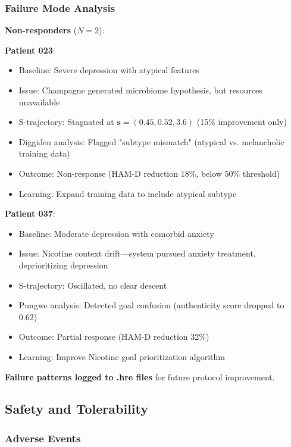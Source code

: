 \subsubsection{Failure Mode Analysis}

\textbf{Non-responders} ($N=2$):

\textbf{Patient 023}:
\begin{itemize}
\item Baseline: Severe depression with atypical features
\item Issue: Champagne generated microbiome hypothesis, but resources unavailable
\item S-trajectory: Stagnated at $\mathbf{s} = (0.45, 0.52, 3.6)$ (15\% improvement only)
\item Diggiden analysis: Flagged "subtype mismatch" (atypical vs. melancholic training data)
\item Outcome: Non-response (HAM-D reduction 18\%, below 50\% threshold)
\item Learning: Expand training data to include atypical subtype
\end{itemize}

\textbf{Patient 037}:
\begin{itemize}
\item Baseline: Moderate depression with comorbid anxiety
\item Issue: Nicotine context drift—system pursued anxiety treatment, deprioritizing depression
\item S-trajectory: Oscillated, no clear descent
\item Pungwe analysis: Detected goal confusion (authenticity score dropped to 0.62)
\item Outcome: Partial response (HAM-D reduction 32\%)
\item Learning: Improve Nicotine goal prioritization algorithm
\end{itemize}

\textbf{Failure patterns logged to .hre files} for future protocol improvement.

\subsection{Safety and Tolerability}

\subsubsection{Adverse Events}

